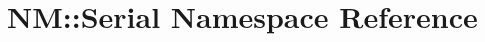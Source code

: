 \hypertarget{namespace_n_m_1_1_serial}{}\section{N\+M\+:\+:Serial Namespace Reference}
\label{namespace_n_m_1_1_serial}
